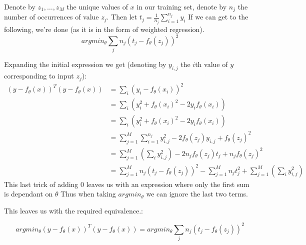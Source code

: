 Denote by $z_1, \dots, z_M$ the unique values of $x$ in our training set, denote by $n_j$ the number of occurrences of value $z_j$. 
Then let $t_j = \frac{1}{n_j}\sum_{i=1}^{n_j} y_i$
If we can get to the following, we're done (as it is in the form of weighted regression). 
$$argmin_\theta \sum_j n_j \left(t_j - f_\theta(z_j)\right)^2$$

Expanding the initial expression we get (denoting by $y_{i,j}$ the $i$th value of $y$ corresponding to input $z_j$):
\begin{align*}
     \left(y - f_\theta(x)\right)^T \left(y - f_\theta(x)\right) &= \sum_i \left(y_i - f_\theta(x_i)\right)^2 \\
    &= \sum_i \left(y_i^2 + f_\theta(x_i)^2 - 2 y_i f_\theta(x_i)\right) \\
    &= \sum_i \left(y_i^2 + f_\theta(x_i)^2 - 2 y_i f_\theta(x_i)\right) \\
    &= \sum_{j=1}^M \sum_{i=1}^{n_j}  y_{i,j}^2 - 2 f_\theta(z_j) y_{i,j} + f_\theta(z_j)^2\\
    &= \sum_{j=1}^M   \left(\sum_i y_{i,j}^2\right) - 2 n_j f_\theta(z_j) t_j + n_j f_\theta(z_j)^2\\
    &= \sum_{j=1}^M   n_j  (t_j -  f_\theta(z_j)) ^ 2 - \sum_{j=1}^M n_j t_j^2 + \sum_{j=1}^M   \left(\sum_i y_{i,j}^2\right) 
\end{align*}
This last trick of adding $0$ leaves us with an expression where only the first sum is dependant on $\theta$
Thus when taking $argmin_\theta$ we can ignore the last two terms.

This leaves us with the required equivalence.:

$$argmin_\theta \left(y - f_\theta(x)\right)^T \left(y - f_\theta(x)\right) = argmin_\theta \sum_j n_j \left(t_j - f_\theta(z_j)\right)^2$$

